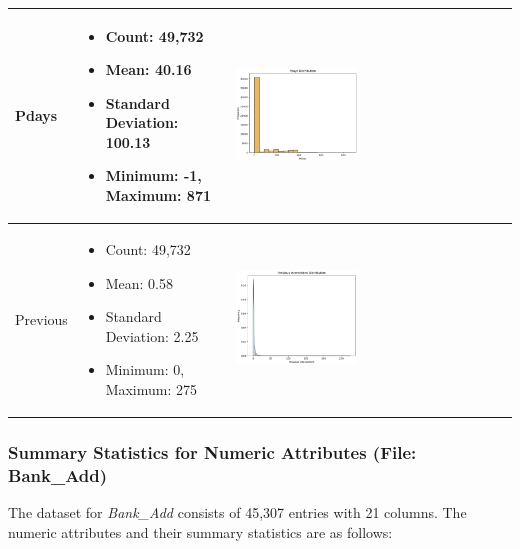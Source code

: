 \documentclass{article}
\begin{document}
\begin{longtable}{|p{}|p{}|p{}|}
    \hline
    Pdays & 
    \begin{itemize}
        \item Count: 49,732
        \item Mean: 40.16
        \item Standard Deviation: 100.13
        \item Minimum: -1, Maximum: 871
    \end{itemize} & 
    \includegraphics[width=0.45\textwidth]{data/bank_marketing/pic/Bank_pdays.png} \\
    \hline
    Previous & 
    \begin{itemize}
        \item Count: 49,732
        \item Mean: 0.58
        \item Standard Deviation: 2.25
        \item Minimum: 0, Maximum: 275
    \end{itemize} & 
    \includegraphics[width=0.45\textwidth]{data/bank_marketing/pic/Bank_Previous.png} \\
    \hline
\end{longtable}

\subsubsection{Summary Statistics for Numeric Attributes (File: Bank\_Add)}

The dataset for \textit{Bank\_Add} consists of 45,307 entries with 21 columns. The numeric attributes and their summary statistics are as follows:\\ \\
\end{document}
